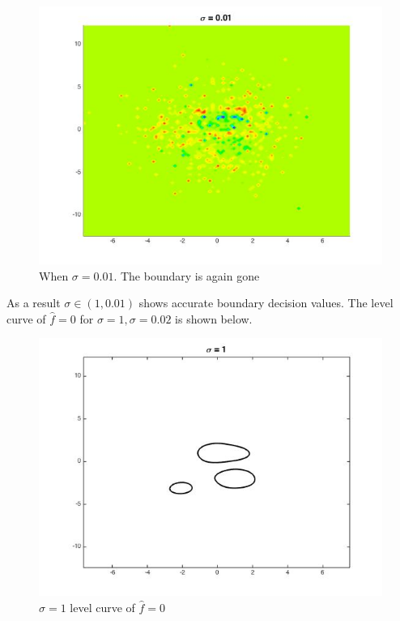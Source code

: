 \documentclass[twoside]{article}
\theoremstyle{definition}
\theoremstyle{definition}
\theoremstyle{remark}
\begin{document}
\begin{figure}[H]
\centering
\includegraphics[width=120mm]{sigma_001.jpg}
\caption{ When $\sigma = 0.01$. The boundary is again gone\label{problem2Pic6}}
\end{figure}

As a result $\sigma \in (1, 0.01)$ shows accurate boundary decision values. The level curve of $\hat f = 0$ for $\sigma = 1, \sigma = 0.02$ is shown below. 
\begin{figure}[H]
\centering
\includegraphics[width=120mm]{sigma_1_level_curve.jpg}
\caption{ $\sigma = 1$ level curve of $\hat f = 0$ \label{problem2Pic6}}
\end{figure}
\end{document}
